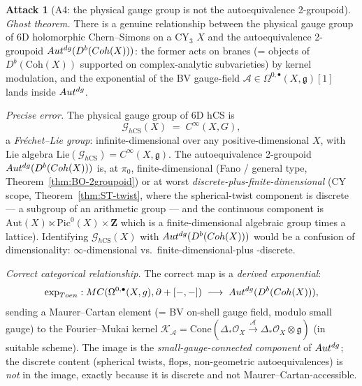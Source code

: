 \documentclass[11pt]{amsart}
\theoremstyle{definition}
\newtheorem{attack}{Attack}
\providecommand{\Coh}{\mathrm{Coh}}
\providecommand{\Aut}{\mathrm{Aut}}
\providecommand{\Autdg}{\mathrm{Aut}^{\rm dg}}
\providecommand{\Pic}{\mathrm{Pic}}
\providecommand{\MC}{\mathrm{MC}}
\providecommand{\hCS}{h\mathrm{CS}}
\providecommand{\fg}{\mathfrak{g}}
\providecommand{\cO}{\mathcal{O}}
\providecommand{\cA}{\mathcal{A}}
\providecommand{\cK}{\mathcal{K}}
\providecommand{\cG}{\mathcal{G}}
\providecommand{\bZ}{\mathbf{Z}}
\begin{document}
\begin{attack}[A4: the physical gauge group is not the autoequivalence
2-groupoid]
\leavevmode

\noindent\emph{Ghost theorem.} There is a genuine relationship between
the physical gauge group of 6D holomorphic Chern--Simons on a CY$_3$
$X$ and the autoequivalence 2-groupoid $\Autdg(D^b(\Coh(X)))$: the
former acts on branes (= objects of $D^b(\Coh(X))$ supported on
complex-analytic subvarieties) by kernel modulation, and the
exponential of the BV gauge-field $\cA \in \Omega^{0,\bullet}(X,
\fg)[1]$ lands inside $\Autdg$.

\noindent\emph{Precise error.} The physical gauge group of 6D hCS is
\[
 \cG_{\hCS}(X) \;=\; C^\infty(X, G),
\]
a \emph{Fr\'echet--Lie group}: infinite-dimensional over any
positive-dimensional $X$, with Lie algebra
$\mathrm{Lie}(\cG_{\hCS}) = C^\infty(X, \fg)$. The autoequivalence
2-groupoid $\Autdg(D^b(\Coh(X)))$ is, at $\pi_0$, finite-dimensional
(Fano / general type, Theorem~\ref{thm:BO-2groupoid}) or at worst
\emph{discrete-plus-finite-dimensional} (CY scope,
Theorem~\ref{thm:ST-twist}, where the spherical-twist component is
discrete --- a subgroup of an arithmetic group --- and the continuous
component is $\Aut(X) \ltimes \Pic^0(X) \times \bZ$ which is a
finite-dimensional algebraic group times a lattice). Identifying
$\cG_{\hCS}(X)$ with $\Autdg(D^b(\Coh(X)))$ would be a confusion
of dimensionality: $\infty$-dimensional vs.\ finite-dimensional-plus
-discrete.

\noindent\emph{Correct categorical relationship.} The correct map is
a \emph{derived exponential}:
\[
 \exp_{\rm Toen} \colon \MC(\Omega^{0,\bullet}(X, \fg), \bar\partial + [-, -])
 \;\longrightarrow\; \Autdg(D^b(\Coh(X))),
\]
sending a Maurer--Cartan element (= BV on-shell gauge field, modulo
small gauge) to the Fourier--Mukai kernel
$\cK_{\cA} = \mathrm{Cone}(\Delta_* \cO_X \xrightarrow{\cA} \Delta_*
\cO_X \otimes \fg)$ (in suitable scheme). The image is the
\emph{small-gauge-connected component} of $\Autdg$; the discrete
content (spherical twists, flops, non-geometric autoequivalences) is
\emph{not} in the image, exactly because it is discrete and not
Maurer--Cartan-accessible.
\end{attack}
\end{document}
